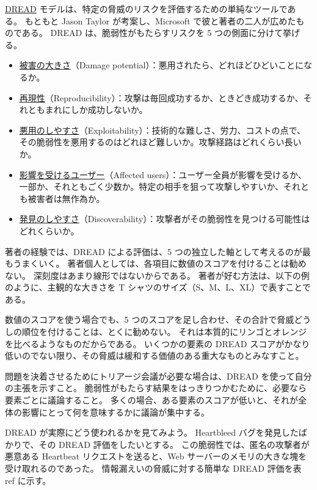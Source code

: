 \documentclass[uplatex]{jsarticle}
\def\ref#1{ref}%
\def\label#1{}%
\begin{document}
\begin{dfn}[DREAD]\label{dfn:ch13-dread}
\underline{DREAD} モデルは、特定の脅威のリスクを評価するための単純なツールである。
もともと Jason Taylor が考案し、Microsoft で彼と著者の二人が広めたものである。
DREAD は、脆弱性がもたらすリスクを 5 つの側面に分けて挙げる。
\begin{itemize}
\item \underline{被害の大きさ}（Damage potential）：悪用されたら、どれほどひどいことになるか。
\item \underline{再現性}（Reproducibility）：攻撃は毎回成功するか、ときどき成功するか、それともまれにしか成功しないか。
\item \underline{悪用のしやすさ}（Exploitability）：技術的な難しさ、労力、コストの点で、その脆弱性を悪用するのはどれほど難しいか。攻撃経路はどれくらい長いか。
\item \underline{影響を受けるユーザー}（Affected users）：ユーザー全員が影響を受けるか、一部か、それともごく少数か。特定の相手を狙って攻撃しやすいか、それとも被害者は無作為か。
\item \underline{発見のしやすさ}（Discoverability）：攻撃者がその脆弱性を見つける可能性はどれくらいか。
\end{itemize}
\end{dfn}

著者の経験では、DREAD による評価は、5 つの独立した軸として考えるのが最もうまくいく。
著者個人としては、各項目に数値のスコアを付けることは勧めない。
深刻度はあまり線形ではないからである。
著者が好む方法は、以下の例のように、主観的な大きさを T シャツのサイズ（S、M、L、XL）で表すことである。

\begin{rem}\label{rem:ch13-dread-no-sum}
数値のスコアを使う場合でも、5 つのスコアを足し合わせ、その合計で脅威どうしの順位を付けることは、とくに勧めない。
それは本質的にリンゴとオレンジを比べるようなものだからである。
いくつかの要素の DREAD スコアがかなり低いのでない限り、その脅威は緩和する価値のある重大なものとみなすこと。
\end{rem}

問題を決着させるためにトリアージ会議が必要な場合は、DREAD を使って自分の主張を示すこと。
脆弱性がもたらす結果をはっきりつかむために、必要なら要素ごとに議論すること。
多くの場合、ある要素のスコアが低いと、それが全体の影響にとって何を意味するかに議論が集中する。

\begin{exa}\label{exa:ch13-heartbleed-dread}
DREAD が実際にどう使われるかを見てみよう。
Heartbleed バグを発見したばかりで、その DREAD 評価をしたいとする。
この脆弱性では、匿名の攻撃者が悪意ある Heartbeat リクエストを送ると、Web サーバーのメモリの大きな塊を受け取れるのであった。
情報漏えいの脅威に対する簡単な DREAD 評価を表 \ref{tab:ch13-heartbleed-dread} に示す。
\end{exa}
\end{document}
